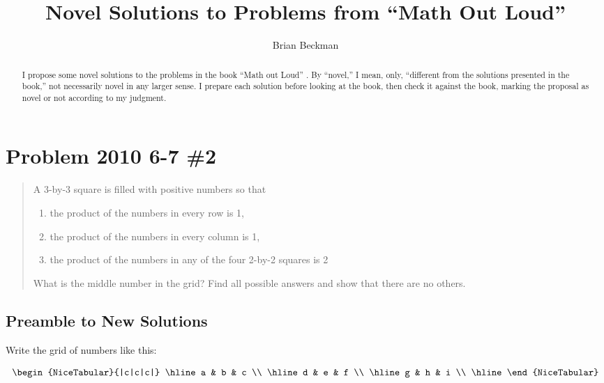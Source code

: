 \documentclass{article}
\title{Novel Solutions to Problems from ``Math Out Loud''}
\author{Brian Beckman}
\begin{document}
\maketitle

\begin{abstract}
I propose some novel solutions to the problems in the book ``Math out Loud'' \cite{MOL21}. By ``novel,'' I mean, only, ``different from the solutions presented in the book,'' not necessarily novel in any larger sense. I prepare each solution before looking at the book, then check it against the book, marking the proposal as novel or not according to my judgment. 
\end{abstract}

\section{Problem 2010 6-7 \#2}

\begin{framed}
\begin{quote}
    A 3-by-3 square is filled with positive numbers so that
    \begin{enumerate}
        \item the product of the numbers in every row is 1, 
        \item the product of the numbers in every column is 1,
        \item the product of the numbers in any of the four 2-by-2 squares is 2
    \end{enumerate}
    What is the middle number in the grid? Find all possible answers and show that there are no others.
\end{quote}
\end{framed}

\subsection{Preamble to New Solutions}

Write the grid of numbers like this:

\begin{equation}
\label{eqn:the-first-grid}
\begin{NiceTabular}{|c|c|c|}
    \hline
    a & b & c  \\ \hline  
    d & e & f  \\ \hline
    g & h & i  \\ \hline
\end{NiceTabular}
\end{equation}
\end{document}
